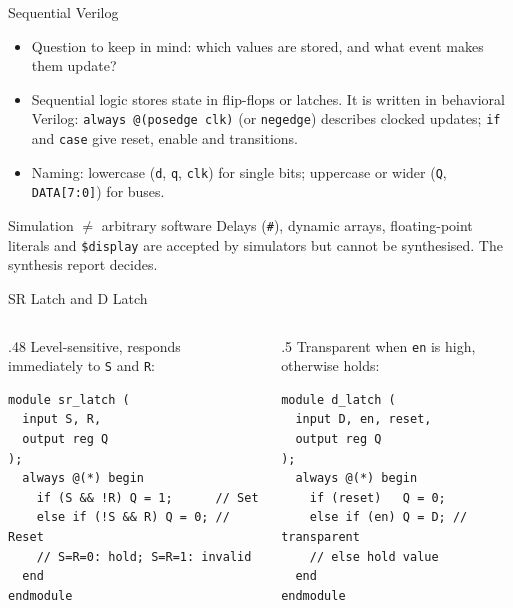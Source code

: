 \documentclass[9pt,aspectratio=169,xcolor=table]{beamer}
\begin{document}
\begin{frame}{Sequential Verilog}
  \begin{itemize}\small\itemsep4pt
    \item \alert{Question to keep in mind}: which values are stored, and what event makes them update?
    \item Sequential logic stores state in flip-flops or latches. It is written in \alert{behavioral} Verilog: \texttt{always @(posedge clk)} (or \texttt{negedge}) describes clocked updates; \texttt{if} and \texttt{case} give reset, enable and transitions.
    \item Naming: lowercase (\texttt{d}, \texttt{q}, \texttt{clk}) for single bits; uppercase or wider (\texttt{Q}, \texttt{DATA[7:0]}) for buses.
  \end{itemize}
  \begin{alertblock}{Simulation $\ne$ arbitrary software}
    \small Delays (\texttt{\#}), dynamic arrays, floating-point literals and \texttt{\$display} are accepted by simulators but cannot be synthesised. The synthesis report decides.
  \end{alertblock}
\end{frame}

\begin{frame}[fragile]{SR Latch and D Latch}
  \begin{columns}[t]
  \begin{column}{.48\textwidth}
    \small Level-sensitive, responds immediately to \texttt{S} and \texttt{R}:
\begin{lstlisting}
module sr_latch (
  input S, R,
  output reg Q
);
  always @(*) begin
    if (S && !R) Q = 1;      // Set
    else if (!S && R) Q = 0; // Reset
    // S=R=0: hold; S=R=1: invalid
  end
endmodule
\end{lstlisting}
  \end{column}
  \begin{column}{.5\textwidth}
    \small Transparent when \texttt{en} is high, otherwise holds:
\begin{lstlisting}
module d_latch (
  input D, en, reset,
  output reg Q
);
  always @(*) begin
    if (reset)   Q = 0;
    else if (en) Q = D; // transparent
    // else hold value
  end
endmodule
\end{lstlisting}
  \end{column}
  \end{columns}
\end{frame}
\end{document}
